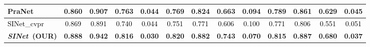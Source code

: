 \documentclass[10pt,journal,compsoc]{IEEEtran}
\newcommand{\Rev}[1]{\textcolor{black}{#1}}
\def\ournewmodel{\emph{SINet}}
\begin{document}
\begin{table*}[t!]
\begin{tabular}{l|cccc||cccc||cccc}
    PraNet~\cite{fan2020pranet}     
    &0.860&0.907&0.763&0.044&0.769&0.824&0.663&0.094&0.789&0.861&0.629&0.045\\
    \hline
    \Rev{SINet\_cvpr~\cite{fan2020camouflaged}}     
    & \Rev{0.869} & \Rev{0.891} & \Rev{0.740} & \Rev{0.044} & \Rev{0.751} & \Rev{0.771} & \Rev{0.606} & \Rev{0.100} & \Rev{0.771} & \Rev{0.806} & \Rev{0.551} & \Rev{0.051} \\
\rowcolor{mygray}\textbf{\ournewmodel~(OUR)}
    & \textbf{0.888} & \textbf{0.942} & \textbf{0.816} & \textbf{0.030}
    & \textbf{0.820} & \textbf{0.882} & \textbf{0.743} & \textbf{0.070}
    & \textbf{0.815} & \textbf{0.887} & \textbf{0.680} & \textbf{0.037} 
    \\ \bottomrule
  \end{tabular}
\end{table*}
\end{document}
